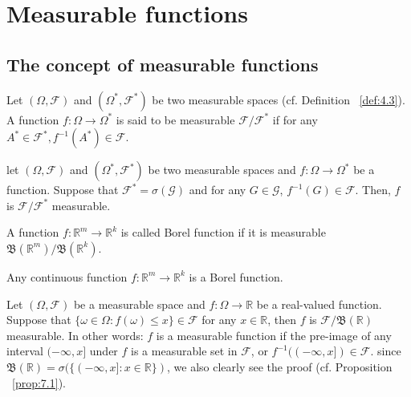 \chapter{Measurable functions}%
\label{cha:Measurable functions}
\section{The concept of measurable functions}%
\label{sec:The concept of measurable functions}

\begin{definition}
    \label{def:7.1}
    Let $(\Omega, \mathcal{F})$ and $(\Omega^{\ast}, \mathcal{F}^{\ast})$ be two measurable spaces 
    (cf. Definition ~\ref{def:4.3}). A function $f: \Omega \to \Omega^{\ast}$ is said to be measurable 
    $\mathcal{F}/\mathcal{F}^{\ast}$ if for any $A^{\ast} \in \mathcal{F}^{\ast}, f^{-1}(A^{\ast}) \in \mathcal{F}$.
\end{definition}

\begin{proposition}
    \label{prop:7.1}
    let $(\Omega, \mathcal{F})$ and $(\Omega^{\ast}, \mathcal{F}^{\ast})$ be two measurable spaces and 
    $f: \Omega \to \Omega^{\ast}$ be a function. Suppose that $\mathcal{F}^{\ast} = \sigma(\mathcal{G})$ 
    and for any $G \in  \mathcal{G}$, $f^{-1}(G) \in \mathcal{F}$. Then, $f$ is 
    $\mathcal{F}/\mathcal{F}^{\ast}$ measurable.
\end{proposition}

\begin{definition}
    \label{def:7.2}
    A function $f: \mathbb{R}^{m} \to \mathbb{R}^{k}$ is called Borel function if it is measurable 
    $\mathfrak{B}(\mathbb{R}^{m})/\mathfrak{B}(\mathbb{R}^{k})$.
\end{definition}

\begin{proposition}
    \label{prop:7.2}
    Any continuous function $f: \mathbb{R}^{m} \to \mathbb{R}^{k}$ is a Borel function.
\end{proposition}

\begin{proposition}
    \label{prop:7.3}
    Let $(\Omega, \mathcal{F})$ be a measurable space and $f: \Omega \to \mathbb{R}$ be a real-valued function. Suppose
    that $\{\omega \in \Omega: f(\omega) \le x\} \in \mathcal{F}$ for any $x \in  \mathbb{R}$, then $f$ is 
    $\mathcal{F}/\mathfrak{B}(\mathbb{R})$ measurable. In other words: $f$ is a measurable function if the pre-image of 
    any interval $(-\infty, x]$ under $f$ is a measurable set in $\mathcal{F}$, or $f^{-1}((-\infty, x]) \in \mathcal{F}$.
    since $\mathfrak{B}(\mathbb{R}) = \sigma(\{(-\infty, x]: x \in  \mathbb{R}\})$, we also clearly see the proof
    (cf. Proposition ~\ref{prop:7.1}).
\end{proposition}

